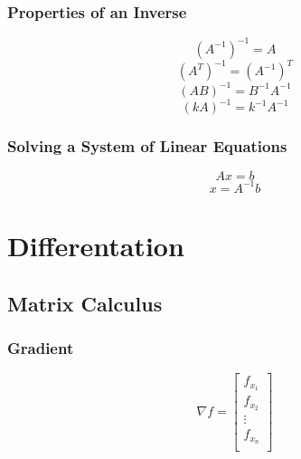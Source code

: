 \documentclass{article}
\begin{document}
        \subsubsection {Properties of an Inverse}
        \begin{equation}
            (A^{-1})^{-1} = A
        \end{equation}
        \begin{equation}
            (A^{T})^{-1} = (A^{-1})^T
        \end{equation}
        \begin{equation}
            (AB)^{-1} = B^{-1}A^{-1}
        \end{equation}
        \begin{equation}
            (kA)^{-1} = k^{-1}A^{-1}
        \end{equation}

        \subsubsection {Solving a System of Linear Equations}
        \begin{equation}
            Ax = b 
        \end{equation}
        \begin{equation}
            x = A^{-1}b
        \end{equation}

    \section{Differentation}

        \subsection{Matrix Calculus}

        \subsubsection{Gradient}
        \begin{equation}
            \nabla f = \begin{bmatrix} 
                f_{x_1} \\
                f_{x_2} \\
                \vdots \\
                f_{x_n} \\
            \end{bmatrix}
        \end{equation}
\end{document}
